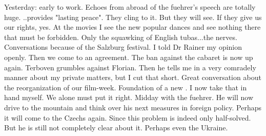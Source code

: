 Yesterday: early to work. Echoes from abroad of the fuehrer's speech are totally huge. ..provides "lasting peace". They cling to it. But they will see. If they give us our rights, yes. At the movies I see the new popular dances and see nothing there that must be forbidden. Only the squawking of English tubas...the nerves. Conversations because of the Salzburg festival. I told Dr Rainer my opinion openly. Then we come to an agreement. The ban against the cabaret is now up again. Terboven grumbles against Florian. Then he tells me in a very comradely manner about my private matters, but I cut that short. Great conversation about the reorganization of our film-week. Foundation of a new . I now take that in hand myself. We alone must put it right. Midday with the fuehrer. He will now drive to the mountain and think over his next measures in foreign policy. Perhaps it will come to the Czechs again. Since this problem is indeed only half-solved. But he is still not completely clear about it. Perhaps even the Ukraine. \missing